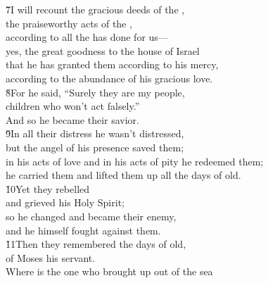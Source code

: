 \begin{poetry}
\poeml \v{7}I will recount the gracious deeds of the , \\
\poemll    the praiseworthy acts of the , \\
\poeml according to all the  has done for us--- \\
\poemll    yes, the great goodness to the house of Israel \\
\poeml that he has granted them according to his mercy, \\
\poemll    according to the abundance of his gracious love. \\
\poeml \v{8}For he said, ``Surely they are my people, \\
\poemll    children who won't act falsely.'' \\
\poemlll       And so he became their savior. \\
\poeml \v{9}In all their distress he wasn't distressed, \\
\poemll    but the angel of his presence saved them; \\
\poeml in his acts of love and in his acts of pity he redeemed them; \\
\poemll    he carried them and lifted them up all the days of old. \\
\poeml \v{10}Yet they rebelled \\
\poemll    and grieved his Holy Spirit; \\
\poeml so he changed and became their enemy, \\
\poemll    and he himself fought against them. \\
\poeml \v{11}Then they remembered the days of old, \\
\poemll    of Moses his servant. \\
\poeml Where is the one who brought up out of the sea \\

\end{poetry}
